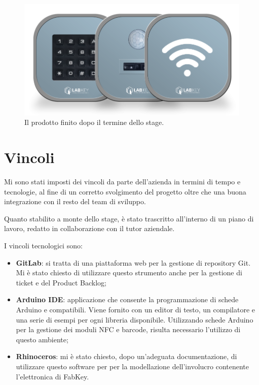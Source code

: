 \begin{figure}[H]
	\begin{center}
	\includegraphics[scale=0.3]{immagini/fabkey_dopo.png}
	\caption{Il prodotto finito dopo il termine dello stage.}
	\end{center}
\end{figure}

\section{Vincoli}
Mi sono stati imposti dei vincoli da parte dell'azienda in termini di tempo e tecnologie, al fine di un corretto svolgimento del progetto oltre che una buona integrazione con il resto del team di sviluppo. 

Quanto stabilito a monte dello stage, è stato trascritto all'interno di un piano di lavoro, redatto in collaborazione con il tutor aziendale.

I vincoli tecnologici sono:
\begin{itemize}
\item \textbf{GitLab}: si tratta di una piattaforma web per la gestione di repository Git. Mi è stato chiesto di utilizzare questo strumento anche per la gestione di ticket e del Product Backlog;
\item \textbf{Arduino IDE}: applicazione che consente la programmazione di schede Arduino e compatibili. Viene fornito con un editor di testo, un compilatore e una serie di esempi per ogni libreria disponibile. Utilizzando schede Arduino per la gestione dei moduli NFC e barcode, risulta necessario l'utilizzo di questo ambiente;
\item \textbf{Rhinoceros}: mi è stato chiesto, dopo un'adeguata documentazione, di utilizzare questo software per per la modellazione dell'involucro contenente l'elettronica di FabKey.
\end{itemize}

